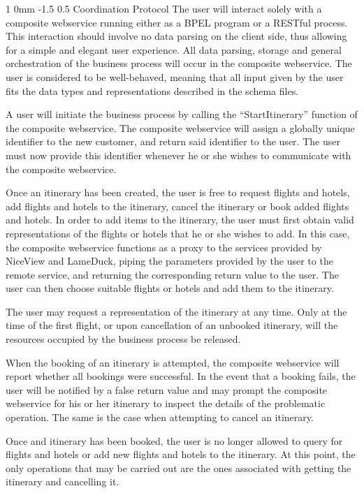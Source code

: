 \documentclass[english, a4paper, 12pt]{article}
\makeatletter
\renewcommand{\section}{\@startsection
{section}%
{1}%
{0mm}%
{-1.5\baselineskip}%
{0.5\baselineskip}%
{\normalfont\Large\bfseries}} %
\makeatother
\begin{document}
\section{Coordination Protocol}
The user will interact solely with a composite webservice running either as a BPEL program or a RESTful process. This interaction should involve no data parsing on the client side, thus allowing for a simple and elegant user experience. All data parsing, storage and general orchestration of the business process will occur in the composite webservice. The user is considered to be well-behaved, meaning that all input given by the user fits the data types and representations described in the schema files. 

A user will initiate the business process by calling the “StartItinerary” function of the composite webservice. The composite webservice will assign a globally unique identifier to the new customer, and return said identifier to the user. The user must now provide this identifier whenever he or she wishes to communicate with the composite webservice. 

Once an itinerary has been created, the user is free to request flights and hotels, add flights and hotels to the itinerary, cancel the itinerary or book added flights and hotels.
In order to add items to the itinerary, the user must first obtain valid representations of the flights or hotels that he or she wishes to add. In this case, the composite webservice functions as a proxy to the services provided by NiceView and LameDuck, piping the parameters provided by the user to the remote service, and returning the corresponding return value to the user. The user can then choose suitable flights or hotels and add them to the itinerary.

The user may request a representation of the itinerary at any time. Only at the time of the first flight, or upon cancellation of an unbooked itinerary, will the resources occupied by the business process be released.

When the booking of an itinerary is attempted, the composite webservice will report whether all bookings were successful. In the event that a booking fails, the user will be notified by a false return value and may prompt the composite webservice for his or her itinerary to inspect the details of the problematic operation. The same is the case when attempting to cancel an itinerary.

Once and itinerary has been booked, the user is no longer allowed to query for flights and hotels or add new flights and hotels to the itinerary. At this point, the only operations that may be carried out are the ones associated with getting the itinerary and cancelling it.
\end{document}
